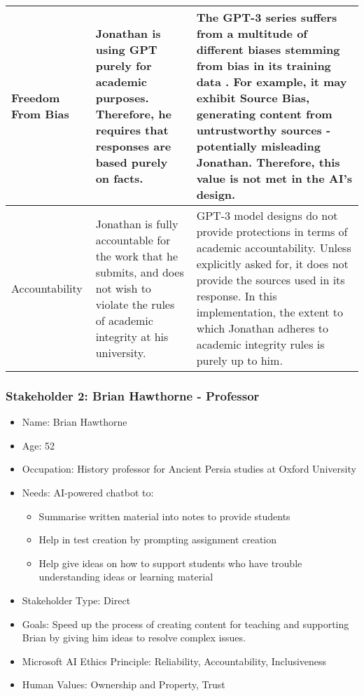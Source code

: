\begin{longtable}{|p{}|p{}|p{}|}
Freedom From Bias & Jonathan is using GPT purely for academic purposes. Therefore, he requires that responses are based purely on facts. & The GPT-3 series suffers from a multitude of different biases stemming from bias in its training data \parencite{Ray2023}. For example, it may exhibit Source Bias, generating content from untrustworthy sources - potentially misleading Jonathan. Therefore, this value is not met in the AI’s design.\\
\hline

Accountability & Jonathan is fully accountable for the work that he submits, and does not wish to violate the rules of academic integrity at his university. &GPT-3 model designs do not provide protections in terms of academic accountability. Unless explicitly asked for, it does not provide the sources used in its response. In this implementation, the extent to which Jonathan adheres to academic integrity rules is purely up to him.\\
\hline

\end{longtable}


\subsubsection{Stakeholder 2: Brian Hawthorne - Professor}

\begin{itemize}
\item Name: Brian Hawthorne
\item Age: 52
\item Occupation: History professor for Ancient Persia studies at Oxford University
\item Needs: AI-powered chatbot to:
  \begin{itemize}
  \item Summarise written material into notes to provide students
  \item Help in test creation by prompting assignment creation
  \item Help give ideas on how to support students who have trouble understanding ideas or learning material
  \end{itemize}
\item Stakeholder Type: Direct
\item Goals: Speed up the process of creating content for teaching and supporting Brian by giving him ideas to resolve complex issues.
\item Microsoft AI Ethics Principle: Reliability, Accountability, Inclusiveness
\item Human Values: Ownership and Property, Trust
\end{itemize}

